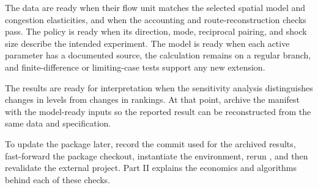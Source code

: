The data are ready when their flow unit matches the selected spatial model and
congestion elasticities, and when the accounting and route-reconstruction
checks pass. The policy is ready when its direction, mode, reciprocal pairing,
and shock size describe the intended experiment. The model is ready when each
active parameter has a documented source, the calculation remains on a regular
branch, and finite-difference or limiting-case tests support any new extension.

The results are ready for interpretation when the sensitivity analysis
distinguishes changes in levels from changes in rankings. At that point, archive
the manifest with the model-ready inputs so the reported result can be
reconstructed from the same data and specification.

To update the package later, record the commit used for the archived results,
fast-forward the package checkout, instantiate the environment, rerun
, and then revalidate the external project. Part II explains
the economics and algorithms behind each of these checks.
